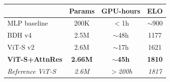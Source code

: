 \documentclass{beamer}
\begin{document}
\begin{frame}
\vspace{0.5em}
\begin{center}
\begin{tabular}{lccc}
\toprule
& \textbf{Params} & \textbf{GPU-hours} & \textbf{ELO} \\
\midrule
MLP baseline    & 200K   & $<$1h   & $\sim$900 \\
BDH v4          & 2.5M   & $\sim$48h & 1177 \\
ViT-S v2        & 2.6M   & $\sim$17h & 1621 \\
\textbf{ViT-S+AttnRes} & \textbf{2.66M} & \textbf{$\sim$45h} & \textbf{1810} \\
\textit{Reference ViT-S} & \textit{2.6M} & \textit{$>$200h} & \textit{1817} \\
\bottomrule
\end{tabular}
\end{center}

\end{frame}
\end{document}
